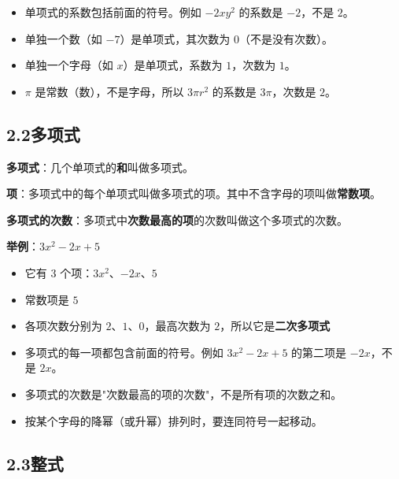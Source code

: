 \documentclass[12pt, a4paper]{ctexart}
\begin{document}
\begin{warnbox}[易错提醒]
\begin{itemize}[leftmargin=*]
  \item 单项式的系数包括前面的符号。例如 $-2xy^2$ 的系数是 $-2$，不是 $2$。
  \item 单独一个数（如 $-7$）是单项式，其次数为 $0$（不是没有次数）。
  \item 单独一个字母（如 $x$）是单项式，系数为 $1$，次数为 $1$。
  \item $\pi$ 是常数（数），不是字母，所以 $3\pi r^2$ 的系数是 $3\pi$，次数是 $2$。
\end{itemize}
\end{warnbox}

\subsection*{2.2\quad 多项式}

\begin{knowledgebox}[多项式的定义]
\textbf{多项式}：几个单项式的\textbf{和}叫做多项式。

\textbf{项}：多项式中的每个单项式叫做多项式的项。其中不含字母的项叫做\textbf{常数项}。

\textbf{多项式的次数}：多项式中\textbf{次数最高的项}的次数叫做这个多项式的次数。

\textbf{举例}：$3x^2 - 2x + 5$
\begin{itemize}[leftmargin=*]
  \item 它有 $3$ 个项：$3x^2$、$-2x$、$5$
  \item 常数项是 $5$
  \item 各项次数分别为 $2$、$1$、$0$，最高次数为 $2$，所以它是\textbf{二次多项式}
\end{itemize}
\end{knowledgebox}

\begin{warnbox}[易错提醒]
\begin{itemize}[leftmargin=*]
  \item 多项式的每一项都包含前面的符号。例如 $3x^2 - 2x + 5$ 的第二项是 $-2x$，不是 $2x$。
  \item 多项式的次数是"次数最高的项的次数"，不是所有项的次数之和。
  \item 按某个字母的降幂（或升幂）排列时，要连同符号一起移动。
\end{itemize}
\end{warnbox}

\subsection*{2.3\quad 整式}
\end{document}
